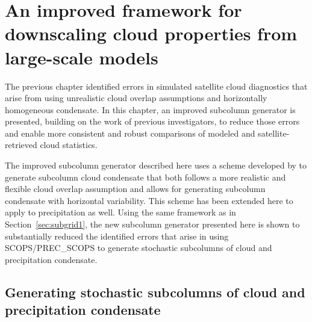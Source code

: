 \chapter{An improved framework for downscaling cloud properties from
large-scale models}\label{sec:subgrid2}

The previous chapter identified errors in simulated satellite cloud
diagnostics that arise from using unrealistic cloud overlap assumptions
and horizontally homogeneous condensate. In this chapter, an improved
subcolumn generator is presented, building on the work of previous
investigators, to reduce those errors and enable more consistent and
robust comparisons of modeled and satellite-retrieved cloud statistics.

The improved subcolumn generator described here uses a scheme developed
by \citet{raisanen_et_al_2004} to generate subcolumn cloud condensate
that both follows a more realistic and flexible cloud overlap assumption
and allows for generating subcolumn condensate with horizontal
variability. This scheme has been extended here to apply to
precipitation as well. Using the same framework as in
Section~\ref{sec:subgrid1}, the new subcolumn generator presented here
is shown to substantially reduced the identified errors that arise in
using SCOPS/PREC\_SCOPS to generate stochastic subcolumns of cloud and
precipitation condensate.

\section{Generating stochastic subcolumns of cloud and precipitation
condensate}\label{sec:subgrid2Generator}

